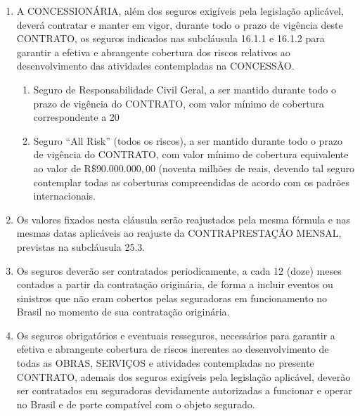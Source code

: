 \documentclass[a4paper,11pt]{report} %
\begin{document}
\begin{enumerate}
\item \label{itm:855U} A CONCESSIONÁRIA, além dos seguros exigíveis pela legislação aplicável, deverá contratar e manter em vigor, durante todo o prazo de vigência deste CONTRATO, os seguros indicados nas subcláusula 16.1.1 e 16.1.2 para garantir a efetiva e abrangente cobertura dos riscos relativos ao desenvolvimento das atividades contempladas na CONCESSÃO.

\begin{enumerate}[label*=\arabic*.]
\item \label {itm:P429} Seguro de Responsabilidade Civil Geral, a ser mantido durante todo o prazo de vigência do CONTRATO, com valor mínimo de cobertura correspondente a 20%

\item \label {itm:S28G} Seguro “All Risk” (todos os riscos), a ser mantido durante todo o prazo de vigência do CONTRATO, com valor mínimo de cobertura equivalente ao valor de R$\$90.000.000,00$ (noventa milhões de reais, devendo tal seguro contemplar todas as coberturas compreendidas de acordo com os padrões internacionais.
\end{enumerate}

\item \label{itm:CHTJ} Os valores fixados nesta cláusula serão reajustados pela mesma fórmula e nas mesmas datas aplicáveis ao reajuste da CONTRAPRESTAÇÃO MENSAL, previstas na subcláusula 25.3.

\item \label{itm:JCKN} Os seguros deverão ser contratados periodicamente, a cada 12 (doze) meses contados a partir da contratação originária, de forma a incluir eventos ou sinistros que não eram cobertos pelas seguradoras em funcionamento no Brasil no momento de sua contratação originária. 

\item \label{itm:V83V} Os seguros obrigatórios e eventuais resseguros, necessários para garantir a efetiva e abrangente cobertura de riscos inerentes ao desenvolvimento de todas as OBRAS, SERVIÇOS e atividades contempladas no presente CONTRATO, ademais dos seguros exigíveis pela legislação aplicável, deverão ser contratados em seguradoras devidamente autorizadas a funcionar e operar no Brasil e de porte compatível com o objeto segurado. 


\end{enumerate}
\end{document}
